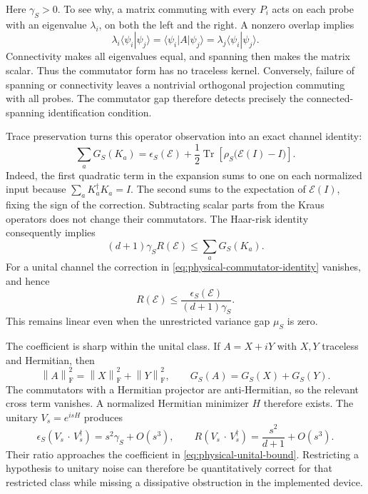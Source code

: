 \documentclass[11pt,a4paper]{article}
\newcommand{\ket}[1]{\lvert #1\rangle}
\newcommand{\bra}[1]{\langle #1\rvert}
\newcommand{\Tr}{\operatorname{Tr}}
\newcommand{\normF}[1]{\left\lVert #1\right\rVert_{\mathrm F}}
\numberwithin{equation}{section}
\begin{document}
Here $\gamma_S>0$. To see why, a matrix commuting with every $P_i$ acts on each probe with an eigenvalue $\lambda_i$, on both the left and the right. A nonzero overlap implies
\[
 \lambda_i\langle\psi_i|\psi_j\rangle
 =\bra{\psi_i}A\ket{\psi_j}
 =\lambda_j\langle\psi_i|\psi_j\rangle.
\]
Connectivity makes all eigenvalues equal, and spanning then makes the matrix scalar. Thus the commutator form has no traceless kernel. Conversely, failure of spanning or connectivity leaves a nontrivial orthogonal projection commuting with all probes. The commutator gap therefore detects precisely the connected-spanning identification condition.

Trace preservation turns this operator observation into an exact channel identity:
\begin{equation}
 \sum_aG_S(K_a)
 =\epsilon_S(\mathcal E)
  +\frac12\Tr\!\left[\rho_S\bigl(\mathcal E(I)-I\bigr)\right].
 \label{eq:physical-commutator-identity}
\end{equation}
Indeed, the first quadratic term in the expansion sums to one on each normalized input because $\sum_aK_a^\dagger K_a=I$. The second sums to the expectation of $\mathcal E(I)$, fixing the sign of the correction. Subtracting scalar parts from the Kraus operators does not change their commutators. The Haar-risk identity consequently implies
\[
 (d+1)\gamma_SR(\mathcal E)
 \le\sum_aG_S(K_a).
\]
For a unital channel the correction in \eqref{eq:physical-commutator-identity} vanishes, and hence
\begin{equation}
 R(\mathcal E)\le\frac{\epsilon_S(\mathcal E)}{(d+1)\gamma_S}.
 \label{eq:physical-unital-bound}
\end{equation}
This remains linear even when the unrestricted variance gap $\mu_S$ is zero.

The coefficient is sharp within the unital class. If $A=X+iY$ with $X,Y$ traceless and Hermitian, then
\[
 \normF{A}^2=\normF{X}^2+\normF{Y}^2,
 \qquad G_S(A)=G_S(X)+G_S(Y).
\]
The commutators with a Hermitian projector are anti-Hermitian, so the relevant cross term vanishes. A normalized Hermitian minimizer $H$ therefore exists. The unitary $V_s=e^{isH}$ produces
\[
 \epsilon_S(V_s\,\cdot\,V_s^\dagger)=s^2\gamma_S+O(s^3),
 \qquad R(V_s\,\cdot\,V_s^\dagger)=\frac{s^2}{d+1}+O(s^3).
\]
Their ratio approaches the coefficient in \eqref{eq:physical-unital-bound}. Restricting a hypothesis to unitary noise can therefore be quantitatively correct for that restricted class while missing a dissipative obstruction in the implemented device.
\end{document}
